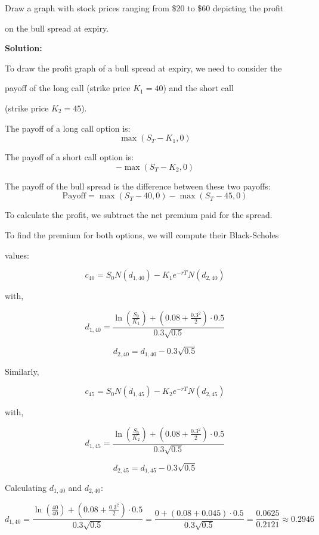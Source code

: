 \documentclass{article}
\begin{document}
\vspace{\baselineskip}

\noindent Draw a graph with stock prices ranging from \$20 to \$60 depicting the profit 

on the bull spread at expiry.

\textbf{Solution:}

To draw the profit graph of a bull spread at expiry, we need to consider the 

payoff of the long call (strike price \( K_1 = 40 \)) and the short call 

(strike price \( K_2 = 45 \)).

\vspace{\baselineskip}

The payoff of a long call option is:
\[
\max(S_T - K_1, 0)
\]

The payoff of a short call option is:
\[
-\max(S_T - K_2, 0)
\]

The payoff of the bull spread is the difference between these two payoffs:
\[
\text{Payoff} = \max(S_T - 40, 0) - \max(S_T - 45, 0)
\]

To calculate the profit, we subtract the net premium paid for the spread.

\vspace{\baselineskip}

To find the premium for both options, we will compute their Black-Scholes 

values:

\[
c_{40} = S_0 N(d_{1,40}) - K_1 e^{-rT} N(d_{2,40})
\]

with,

\[
d_{1,40} = \frac{\ln\left(\frac{S_0}{K_1}\right) + \left(0.08 + \frac{0.3^2}{2}\right) \cdot 0.5}{0.3 \sqrt{0.5}}
\]

\[
d_{2,40} = d_{1,40} - 0.3 \sqrt{0.5}
\]

Similarly,

\[
c_{45} = S_0 N(d_{1,45}) - K_2 e^{-rT} N(d_{2,45})
\]

with,

\[
d_{1,45} = \frac{\ln\left(\frac{S_0}{K_2}\right) + \left(0.08 + \frac{0.3^2}{2}\right) \cdot 0.5}{0.3 \sqrt{0.5}}
\]

\[
d_{2,45} = d_{1,45} - 0.3 \sqrt{0.5}
\]

Calculating \( d_{1,40} \) and \( d_{2,40} \):

\[
d_{1,40} = \frac{\ln\left(\frac{40}{40}\right) + \left(0.08 + \frac{0.3^2}{2}\right) \cdot 0.5}{0.3 \sqrt{0.5}} = \frac{0 + \left(0.08 + 0.045\right) \cdot 0.5}{0.3 \sqrt{0.5}} = \frac{0.0625}{0.2121} \approx 0.2946
\]
\end{document}

